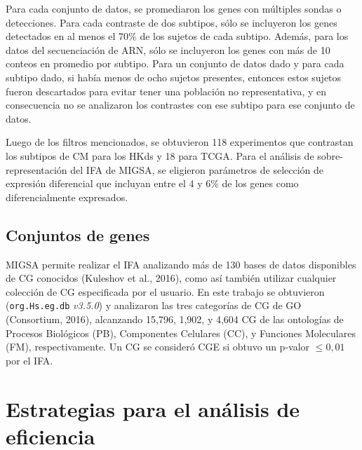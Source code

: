 \documentclass[12pt,twoside]{reedthesis}
\begin{document}
Para cada conjunto de datos, se promediaron los genes con múltiples sondas o detecciones. Para cada contraste de dos subtipos, sólo se incluyeron los genes detectados en al menos el 70\% de los sujetos de cada subtipo. Además, para los datos del secuenciación de ARN, sólo se incluyeron los genes con más de 10 conteos en promedio por subtipo. Para un conjunto de datos dado y para cada subtipo dado, si había menos de ocho sujetos presentes, entonces estos sujetos fueron descartados para evitar tener una población no representativa, y en consecuencia no se analizaron los contrastes con ese subtipo para ese conjunto de datos.

\par

Luego de los filtros mencionados, se obtuvieron 118 experimentos que contrastan los subtipos de CM para los HKds y 18 para TCGA. Para el análisis de sobre-representación del IFA de MIGSA, se eligieron parámetros de selección de expresión diferencial que incluyan entre el 4 y 6\% de los genes como diferencialmente expresados.

\hypertarget{conjuntos-de-genes-1}{%
\subsection{Conjuntos de genes}\label{conjuntos-de-genes-1}}

\par

MIGSA permite realizar el IFA analizando más de 130 bases de datos disponibles de CG conocidos (Kuleshov et al., 2016), como así también utilizar cualquier colección de CG especificada por el usuario. En este trabajo se obtuvieron (\texttt{org.Hs.eg.db} \emph{v3.5.0}) y analizaron las tres categorías de CG de GO (Consortium, 2016), alcanzando 15,796, 1,902, y 4,604 CG de las ontologías de Procesos Biológicos (PB), Componentes Celulares (CC), y Funciones Moleculares (FM), respectivamente. Un CG se consideró CGE si obtuvo un p-valor \(\le 0,01\) por el IFA.

\hypertarget{estrategias-para-el-analisis-de-eficiencia}{%
\section{Estrategias para el análisis de eficiencia}\label{estrategias-para-el-analisis-de-eficiencia}}

\par
\end{document}
